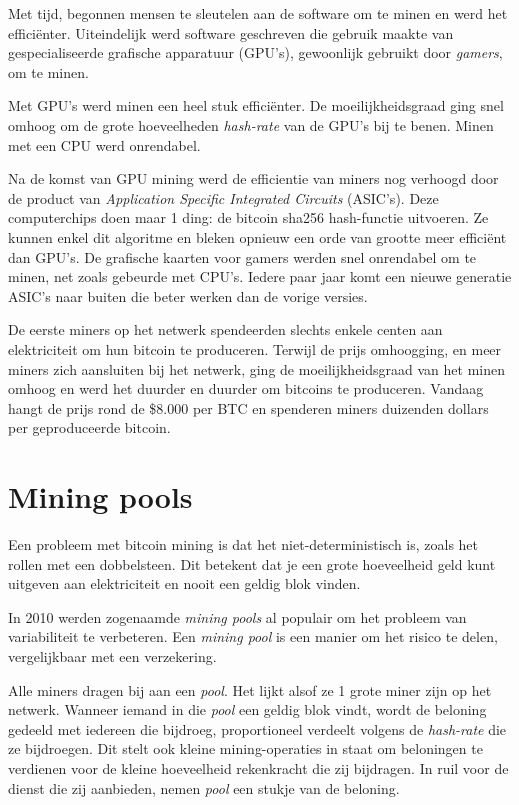 \documentclass[smalldemyvopaper,11pt,twoside,onecolumn,openright,extrafontsizes]{memoir}
\begin{document}
Met tijd, begonnen mensen te sleutelen aan de software om te minen en werd het efficiënter. Uiteindelijk werd software geschreven die gebruik maakte van gespecialiseerde grafische apparatuur (GPU’s), gewoonlijk gebruikt door \textit{gamers}, om te minen.

Met GPU’s werd minen een heel stuk efficiënter. De moeilijkheidsgraad ging snel omhoog om de grote hoeveelheden \textit{hash-rate} van de GPU’s bij te benen. Minen met een CPU werd onrendabel.

Na de komst van GPU mining werd de efficientie van miners nog verhoogd door de product van \textit{Application Specific Integrated Circuits} (ASIC’s). Deze computerchips doen maar 1 ding: de bitcoin sha256 hash-functie uitvoeren. Ze kunnen enkel dit algoritme en bleken opnieuw een orde van grootte meer efficiënt dan GPU’s. De grafische kaarten voor gamers werden snel onrendabel om te minen, net zoals gebeurde met CPU’s. Iedere paar jaar komt een nieuwe generatie ASIC’s naar buiten die beter werken dan de vorige versies.

De eerste miners op het netwerk spendeerden slechts enkele centen aan elektriciteit om hun bitcoin te produceren. Terwijl de prijs omhoogging, en meer miners zich aansluiten bij het netwerk, ging de moeilijkheidsgraad van het minen omhoog en werd het duurder en duurder om bitcoins te produceren. Vandaag hangt de prijs rond de \$8.000 per BTC en spenderen miners duizenden dollars per geproduceerde bitcoin.

\section{Mining pools}
Een probleem met bitcoin mining is dat het niet-deterministisch is, zoals het rollen met een dobbelsteen. Dit betekent dat je een grote hoeveelheid geld kunt uitgeven aan elektriciteit en nooit een geldig blok vinden.

In 2010 werden zogenaamde \textit{mining pools} al populair om het probleem van variabiliteit te verbeteren. Een \textit{mining pool} is een manier om het risico te delen, vergelijkbaar met een verzekering.

Alle miners dragen bij aan een \textit{pool}. Het lijkt alsof ze 1 grote miner zijn op het netwerk. Wanneer iemand in die \textit{pool} een geldig blok vindt, wordt de beloning gedeeld met iedereen die bijdroeg, proportioneel verdeelt volgens de \textit{hash-rate} die ze bijdroegen. Dit stelt ook kleine mining-operaties in staat om beloningen te verdienen voor de kleine hoeveelheid rekenkracht die zij bijdragen. In ruil voor de dienst die zij aanbieden, nemen \textit{pool} een stukje van de beloning.
\end{document}

